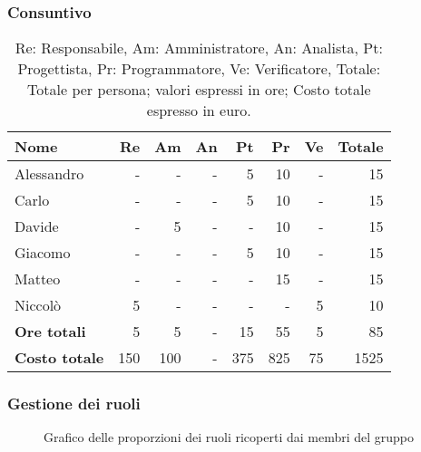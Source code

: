 \subsubsection{Consuntivo}
\begin{table}[H]
	\centering
	\begin{tabular}{l|r|r|r|r|r|r|r}
		\textbf{Nome}         & \textbf{Re} & \textbf{Am} & \textbf{An} & \textbf{Pt} & \textbf{Pr} & \textbf{Ve} & \textbf{Totale} \\
		\hline
		Alessandro            & -           & -           & -           & 5           & 10           & -           & 15              \\
		Carlo                 & -           & -           & -           & 5           & 10           & -           & 15              \\
		Davide                & -           & 5           & -           & -           & 10           & -           & 15              \\
		Giacomo               & -           & -           & -           & 5           & 10          	& -           & 15              \\
		Matteo                & -           & -           & -           & -           & 15           & -           & 15              \\
		Niccolò               & 5           & -           & -           & -           & -           & 5           & 10              \\
		\hline
		\textbf{Ore totali}   & 5           & 5           & -           & 15          & 55          & 5          & 85              \\
		\textbf{Costo totale} & 150         & 100         & -           & 375         & 825         & 75         & 1525
	\end{tabular}
	\caption{Re: Responsabile, Am: Amministratore, An: Analista, Pt: Progettista,
		Pr: Programmatore, Ve: Verificatore, Totale: Totale per persona; valori espressi in ore; Costo totale espresso in euro.}
\end{table}

\subsubsection{Gestione dei ruoli}
\begin{figure}[h]
	\centering
	\caption{Grafico delle proporzioni dei ruoli ricoperti dai membri del gruppo}
\end{figure}

